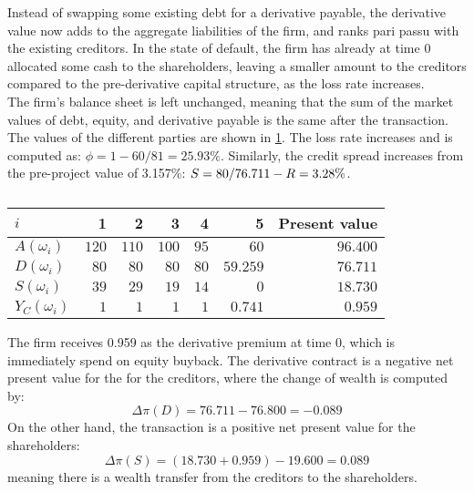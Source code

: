 \documentclass[../main.tex]{subfiles}
\begin{document}
            Instead of swapping some existing debt for a derivative payable, 
            the derivative value now adds to the aggregate liabilities of the firm, 
            and ranks pari passu with the existing creditors. 
            In the state of default, the firm has already at time 0 allocated some cash to the shareholders, 
            leaving a smaller amount to the creditors compared to the pre-derivative capital structure, 
            as the loss rate increases.\\
            The firm's balance sheet is left unchanged, meaning that the sum of the market values of debt, equity, 
            and derivative payable is the same after the transaction. 
            The values of the different parties are shown in \cref{tbl:example-equity-buyback}. 
            The loss rate increases and is computed as: $\phi = 1 - 60/81 = 25.93\%$. 
            Similarly, the credit spread increases from the pre-project value of 3.157\%: $S = 80/76.711 - R = 3.28\%$.
            \begin{table}[H]
                \centering
                \begin{tabular}{l|rrrrr||r}
                    $i$ & 1 & 2 & 3 & 4 & 5 & Present value \\
                    \hline
                    $A(\omega_{i})$ & $120$ & $110$ & $100$ & $95$ & $60$ & $96.400$ \\
                    $D(\omega_{i})$ & $80$ & $80$ & $80$ & $80$ & $59.259$ & $76.711$ \\
                    $S(\omega_{i})$ & $39$ & $29$ & $19$ & $14$ & $0$ & $18.730$ \\
                    $Y_C(\omega_{i})$ & $1$ & $1$ & $1$ & $1$ & $0.741$ & $0.959$ \\
                \end{tabular}
                \caption{}
                \label{tbl:example-equity-buyback}
            \end{table}

            The firm receives 0.959 as the derivative premium at time 0, which is immediately spend on equity buyback. 
            The derivative contract is a negative net present value for the for the creditors, 
            where the change of wealth is computed by:
            \begin{equation}
                \Delta \pi(D) = 76.711 - 76.800 = -0.089
            \end{equation}
            On the other hand, the transaction is a positive net present value for the shareholders:
            \begin{equation}
                \Delta \pi(S) = (18.730 + 0.959) - 19.600 = 0.089
            \end{equation}
            meaning there is a wealth transfer from the creditors to the shareholders.
\end{document}
